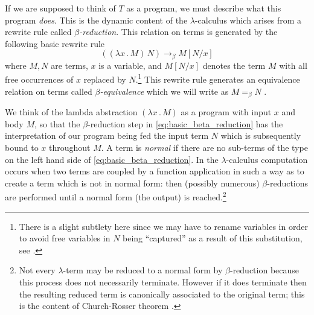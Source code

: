 \documentclass[english,letter paper,12pt,reqno]{article}
\theoremstyle{example}
\numberwithin{equation}{section}
\begin{document}
If we are supposed to think of $T$ as a program, we must describe what this program \emph{does}. This is the dynamic content of the $\lambda$-calculus which arises from a rewrite rule called \emph{$\beta$-reduction}. This relation on terms is generated by the following basic rewrite rule
\begin{equation}\label{eq:basic_beta_reduction}
( (\lambda x \,.\, M)\, N) \longrightarrow_\beta M[N/x]
\end{equation}
where $M,N$ are terms, $x$ is a variable, and $M[N/x]$ denotes the term $M$ with all free occurrences of $x$ replaced by $N$.\footnote{There is a slight subtlety here since we may have to rename variables in order to avoid free variables in $N$ being ``captured'' as a result of this substitution, see \cite[\S 2.3]{selinger}.} This rewrite rule generates an equivalence relation on terms called \emph{$\beta$-equivalence} which we will write as $M =_{\beta} N$ \cite[\S 2.5]{selinger}.

We think of the lambda abstraction $(\lambda x \,.\, M)$ as a program with input $x$ and body $M$, so that the $\beta$-reduction step in \eqref{eq:basic_beta_reduction} has the interpretation of our program being fed the input term $N$ which is subsequently bound to $x$ throughout $M$. A term is \emph{normal} if there are no sub-terms of the type on the left hand side of \eqref{eq:basic_beta_reduction}. In the $\lambda$-calculus computation occurs when two terms are coupled by a function application in such a way as to create a term which is not in normal form: then (possibly numerous) $\beta$-reductions are performed until a normal form (the output) is reached.\footnote{Not every $\lambda$-term may be reduced to a normal form by $\beta$-reduction because this process does not necessarily terminate. However if it does terminate then the resulting reduced term is canonically associated to the original term; this is the content of Church-Rosser theorem \cite[\S 4.2]{selinger}.}
\end{document}
